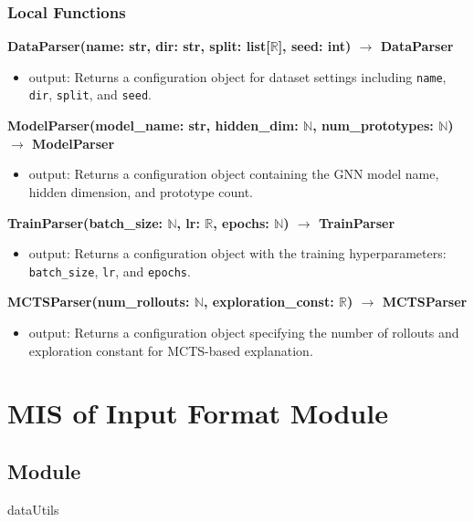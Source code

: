 \documentclass[12pt, titlepage]{article}
\begin{document}
\subsubsection{Local Functions}

\noindent \textbf{DataParser(name: str, dir: str, split: list[\(\mathbb{R}\)], seed: int) \(\rightarrow\) DataParser}
\begin{itemize}
  \item output: Returns a configuration object for dataset settings including \texttt{name}, \texttt{dir}, \texttt{split}, and \texttt{seed}.
\end{itemize}

\noindent \textbf{ModelParser(model\_name: str, hidden\_dim: \(\mathbb{N}\), num\_prototypes: \(\mathbb{N}\)) \(\rightarrow\) ModelParser}
\begin{itemize}
  \item output: Returns a configuration object containing the GNN model name, hidden dimension, and prototype count.
\end{itemize}

\noindent \textbf{TrainParser(batch\_size: \(\mathbb{N}\), lr: \(\mathbb{R}\), epochs: \(\mathbb{N}\)) \(\rightarrow\) TrainParser}
\begin{itemize}
  \item output: Returns a configuration object with the training hyperparameters: \texttt{batch\_size}, \texttt{lr}, and \texttt{epochs}.
\end{itemize}

\noindent \textbf{MCTSParser(num\_rollouts: \(\mathbb{N}\), exploration\_const: \(\mathbb{R}\)) \(\rightarrow\) MCTSParser}
\begin{itemize}
  \item output: Returns a configuration object specifying the number of rollouts and exploration constant for MCTS-based explanation.
\end{itemize}

\vspace{0.5em}






\newpage



\section{MIS of Input Format Module} \label{InputFormat}

\subsection{Module}
dataUtils
\end{document}
